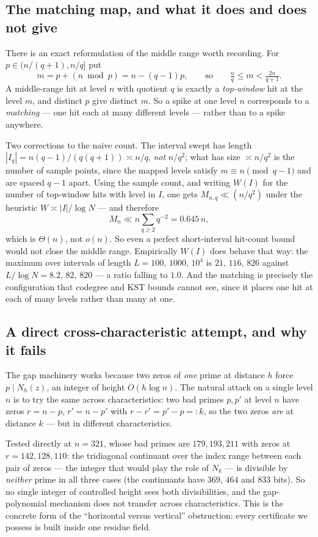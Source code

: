 \subsection{The matching map, and what it does and does not give}

There is an exact reformulation of the middle range worth recording.  For $p\in(n/(q+1),n/q]$ put
\[
  m=p+(n\bmod p)=n-(q-1)p,\qquad\text{so}\qquad \tfrac nq\le m<\tfrac{2n}{q+1}.
\]
A middle-range hit at level $n$ with quotient $q$ is exactly a \emph{top-window} hit at the level
$m$, and distinct $p$ give distinct $m$.  So a spike at one level $n$ corresponds to a
\emph{matching} — one hit each at many different levels — rather than to a spike anywhere.

Two corrections to the naive count.  The interval swept has length
$|I_q|=n(q-1)/(q(q+1))\asymp n/q$, \emph{not} $n/q^2$; what has size $\asymp n/q^2$ is the number
of sample points, since the mapped levels satisfy $m\equiv n\pmod{q-1}$ and are spaced $q-1$
apart.  Using the sample count, and writing $W(I)$ for the number of top-window hits with level in
$I$, one gets $M_{n,q}\ll(n/q^2)$ under the heuristic $W\asymp|I|/\log N$ — and therefore
\[
  M_n\ll n\sum_{q\ge2}q^{-2}=0.645\,n,
\]
which is $\Theta(n)$, not $o(n)$.  So even a perfect short-interval hit-count bound would not
close the middle range.  Empirically $W(I)$ does behave that way: the maximum over intervals of
length $L=100,\,1000,\,10^4$ is $21,\,116,\,826$ against $L/\log N=8.2,\,82,\,820$ — a ratio
falling to $1.0$.  And the matching is precisely the configuration that codegree and KST bounds
cannot see, since it places one hit at each of many levels rather than many at one.

\subsection{A direct cross-characteristic attempt, and why it fails}

The gap machinery works because two zeros of \emph{one} prime at distance $h$ force
$p\mid N_h(z)$, an integer of height $O(h\log n)$.  The natural attack on a single level $n$ is to
try the same across characteristics: two bad primes $p,p'$ at level $n$ have zeros
$r=n-p$, $r'=n-p'$ with $r-r'=p'-p=:k$, so the two zeros \emph{are} at distance $k$ — but in
different characteristics.

Tested directly at $n=321$, whose bad primes are $179,193,211$ with zeros at $r=142,128,110$:
the tridiagonal continuant over the index range between each pair of zeros — the integer that
would play the role of $N_k$ — is divisible by \emph{neither} prime in all three cases
(the continuants have $369$, $464$ and $833$ bits).  So no single integer of controlled height
sees both divisibilities, and the gap-polynomial mechanism does not transfer across
characteristics.  This is the concrete form of the ``horizontal versus vertical'' obstruction:
every certificate we possess is built inside one residue field.

